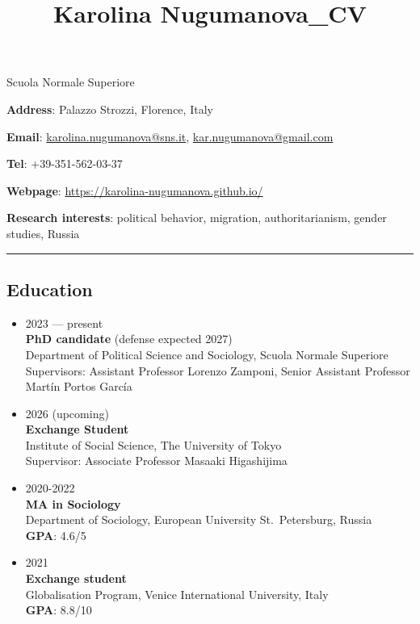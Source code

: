 \documentclass[
]{article}
\title{Karolina Nugumanova\_CV}
\author{}
\date{\vspace{-2.5em}}
\begin{document}
\maketitle

\centerline{Scuola Normale Superiore} \centerline{\textbf{Address}: Palazzo Strozzi, Florence, Italy} \centerline{\textbf{Email}: \href{mailto:karolina.nugumanova@sns.it}{karolina.nugumanova@sns.it}, \href{mailto:kar.nugumanova@gmail.com}{kar.nugumanova@gmail.com}} \centerline{\textbf{Tel}: +39-351-562-03-37} \centerline{\textbf{Webpage}: \url{https://karolina-nugumanova.github.io/}}

\textbf{Research interests}: political behavior, migration,
authoritarianism, gender studies, Russia

\vspace{1mm} \hrule

\hypertarget{education}{%
\subsection{Education}\label{education}}

\begin{itemize}
\item
  2023 --- present\\
  \textbf{PhD candidate} (defense expected 2027)\\
  Department of Political Science and Sociology, Scuola Normale
  Superiore\\
  Supervisors: Assistant Professor Lorenzo Zamponi, Senior Assistant
  Professor Martín Portos García
\item
  2026 (upcoming)\\
  \textbf{Exchange Student}\\
  Institute of Social Science, The University of Tokyo\\
  Supervisor: Associate Professor Masaaki Higashijima
\item
  2020-2022\\
  \textbf{MA in Sociology}\\
  Department of Sociology, European University St.~Petersburg, Russia\\
  \textbf{GPA}: 4.6/5
\item
  2021\\
  \textbf{Exchange student}\\
  Globalisation Program, Venice International University, Italy\\
  \textbf{GPA}: 8.8/10
\end{itemize}
\end{document}
